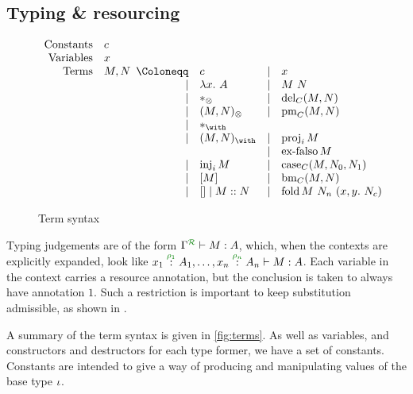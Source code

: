 \subsection{Typing \& resourcing}

\begin{figure}
  \begin{displaymath}
    \begin{array}{rl}
      \textrm{Constants} & c \\
      \textrm{Variables} & x \\
      \textrm{Terms} & M, N
                       \begin{array}[t]{rlcl}
                         \Coloneqq & c & \mid & x \\
                         \mid & \lam{x}{A} & \mid & \app{M}{N} \\
                         \mid & \unit & \mid & \del{C}{M}{N} \\
                         \mid & \ten{M}{N} & \mid & \prm{C}{M}{x}{y}{N} \\
                         \mid & \eat & & \\
                         \mid & \wth{M}{N} & \mid & \proj{i}{M} \\
                                   & & \mid & \exf{C}{M} \\ 
                         \mid & \inj{i}{M} & \mid & \cse{C}{M}{x}{N_0}{y}{N_1} \\
                         \mid & \bang{M} & \mid & \bm{C}{M}{x}{N} \\
                         \mid & \nil \mid \cons{M}{N} & \mid & \fold{M}{N_n}{x}{y}{N_c}
                       \end{array}
    \end{array}
  \end{displaymath}
  \caption{Term syntax}
  \label{fig:terms}
\end{figure}

Typing judgements are of the form $\ctx{\Gamma}{R} \vdash M : A$, which, when
the contexts are explicitly expanded, look like
$\ctxvar{x_1}{A_1}{\rho_1}, \ldots, \ctxvar{x_n}{A_n}{\rho_n} \vdash M : A$.
Each variable in the context carries a resource annotation, but the conclusion
is taken to always have annotation $1$.
Such a restriction is important to keep substitution admissible, as shown in
\cite{quantitative-type-theory}.

A summary of the term syntax is given in \autoref{fig:terms}.
As well as variables, and constructors and destructors for each type former, we
have a set of constants.
Constants are intended to give a way of producing and manipulating values of the
base type $\iota$.

